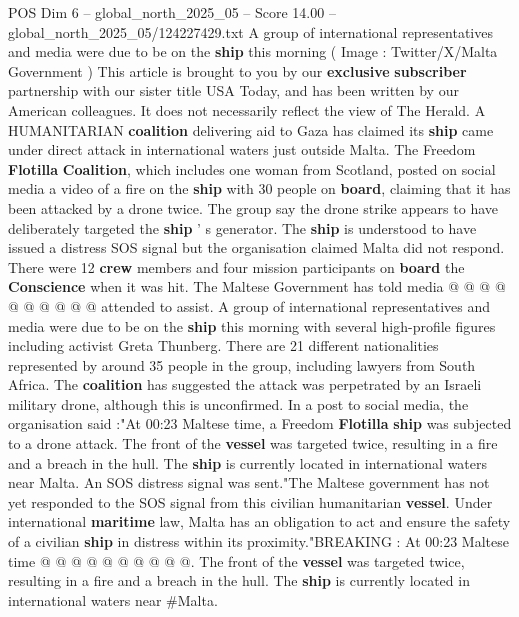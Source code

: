 \begin{textsample}{POS Dim 6 – global\_north\_2025\_05 – Score 14.00 – global\_north\_2025\_05/124227429.txt}  \label{ex:f6_pos_043}
A group of international representatives and media were due to be on the \textbf{ship} this morning ( Image : Twitter/X/Malta Government ) This article is brought to you by our \textbf{exclusive} \textbf{subscriber} partnership with our sister title USA Today, and has been written by our American colleagues.
It does not necessarily reflect the view of The Herald.
A HUMANITARIAN \textbf{coalition} delivering aid to Gaza has claimed its \textbf{ship} came under direct attack in international waters just outside Malta.
The Freedom \textbf{Flotilla} \textbf{Coalition}, which includes one woman from Scotland, posted on social media a video of a fire on the \textbf{ship} with 30 people on \textbf{board}, claiming that it has been attacked by a drone twice.
The group say the drone strike appears to have deliberately targeted the \textbf{ship} ' s generator.
The \textbf{ship} is understood to have issued a distress SOS signal but the organisation claimed Malta did not respond.
There were 12 \textbf{crew} members and four mission participants on \textbf{board} the \textbf{Conscience} when it was hit.
The Maltese Government has told media @ @ @ @ @ @ @ @ @ @ attended to assist.
A group of international representatives and media were due to be on the \textbf{ship} this morning with several high-profile figures including activist Greta Thunberg.
There are 21 different nationalities represented by around 35 people in the group, including lawyers from South Africa.
The \textbf{coalition} has suggested the attack was perpetrated by an Israeli military drone, although this is unconfirmed.
In a post to social media, the organisation said :"At 00:23 Maltese time, a Freedom \textbf{Flotilla} \textbf{ship} was subjected to a drone attack.
The front of the \textbf{vessel} was targeted twice, resulting in a fire and a breach in the hull.
The \textbf{ship} is currently located in international waters near Malta.
An SOS distress signal was sent."The Maltese government has not yet responded to the SOS signal from this civilian humanitarian \textbf{vessel}.
Under international \textbf{maritime} law, Malta has an obligation to act and ensure the safety of a civilian \textbf{ship} in distress within its proximity."BREAKING : At 00:23 Maltese time @ @ @ @ @ @ @ @ @ @.
The front of the \textbf{vessel} was targeted twice, resulting in a fire and a breach in the hull.
The \textbf{ship} is currently located in international waters near \#Malta.

\end{textsample}
